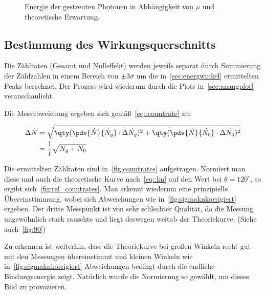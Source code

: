 \documentclass[slug=CS, room=Andreas-Schubert-Bau\,\ Labor\ 406,
supervisor=Juliane\ Volkmer, coursedate=29.\ 11.\ 2019]{../../Lab_Report_LaTeX/lab_report}
\begin{document}
\begin{figure}[H]\centering
  
  \caption{Energie der gestreuten Photonen in Abhängigkeit von \(\mu\)
  und theoretische Erwartung.}
  \label{fig:energycurve}
\end{figure}

\subsection{Bestimmung des Wirkungsquerschnitts}
\label{sec:wirkquer}
Die Zählraten (Gesamt und Nulleffekt) werden jeweils separat durch
Summierung der Z\"ahlzahlen in einem Bereich von \(\pm 3\sigma\) um
die in~\ref{sec:energwinkel} ermittelten Peaks berechnet.  Der Prozess
wird wiederum durch die Plots in~\ref{sec:anangplot} veranschaulicht.

Die Messabweichung ergeben sich gem\"a\ss{}~\eqref{eq::countrate} zu:

\begin{align}
  \Delta\dot{N} &= \sqrt{\qty(\pdv{\dot{N}}{\dot{N_g}}\cdot\Delta\dot{N_g})^2 + \qty(\pdv{\dot{N}}{\dot{N_0}}\cdot\Delta\dot{N_0})^2} \\
                &= \frac{1}{t}\sqrt{N_g + N_0} \\
\end{align}

Die ermittelten Zählraten sind in~\ref{fig:countrates}
aufgetragen. Normiert man diese und auch die theoretische Kurve
nach~\eqref{eq::kn} auf den Wert bei \(\theta = 120^\circ\), so ergibt
sich~\ref{fig:rel_countrates}. Man erkennt wiederum eine prinzipielle
\"Ubereinstimmung, wobei sich Abweichungen wie
in~\ref{fig:sigmaknkorrigiert} ergeben. Der dritte Messpunkt ist von
sehr schlechter Qualit\"at, da die Messung ungew\"ohnlich stark
rauschte und liegt deswegen weitab der Theoriekurve. (Siehe
auch~\ref{fig:90})

Zu erkennen ist weiterhin, dass die Theoriekurve bei gro\ss{}en Winkeln
recht gut mit den Messungen \"ubereinstimmt und kleinen Winkeln
wie in~\ref{fig:sigmaknkorrigiert} Abweichungen bedingt durch die
endliche Bindungsenergie zeigt. Nat\"urlich wurde die Normierung so
gew\"ahlt, um dieses Bild zu provozieren.
\end{document}
